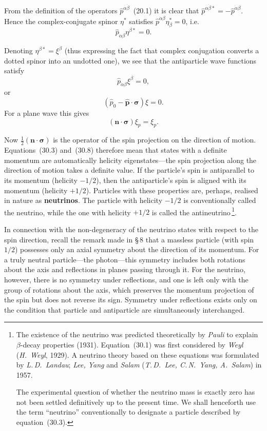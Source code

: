 From the definition of the operators $\widehat p^{\alpha\dot\beta}$~(20.1) it is clear that $\widehat p^{\alpha\dot\beta*} = -\widehat p^{\dot\alpha\beta}$. Hence the complex-conjugate spinor $\eta^*$ satisfies $\widehat p^{\dot\alpha\beta}\eta^*_\beta = 0$, i.e.\
\[
\widehat p_{\dot\alpha\beta}\eta^{\beta*} = 0.
\]

Denoting $\eta^{\beta*} = \xi^\beta$ (thus expressing the fact that complex conjugation converts a dotted spinor into an undotted one), we see that the antiparticle wave functions satisfy
\begin{equation}
\widehat p_{\dot\alpha\beta}\xi^\beta = 0,
\tag{30.6}
\end{equation}
or
\begin{equation}
(\widehat p_0 - \widehat{\mathbf{p}}\cdot\boldsymbol{\sigma})\xi = 0.
\tag{30.7}
\end{equation}
For a plane wave this gives
\begin{equation}
(\mathbf{n}\cdot\boldsymbol{\sigma})\xi_p = \xi_p.
\tag{30.8}
\end{equation}

Now $\frac{1}{2}(\mathbf{n}\cdot\boldsymbol{\sigma})$ is the operator of the spin projection on the direction of motion. Equations~(30.3) and~(30.8) therefore mean that states with a definite momentum are automatically helicity eigenstates---the spin projection along the direction of motion takes a definite value. If the particle's spin is antiparallel to its momentum (helicity $-1/2$), then the antiparticle's spin is aligned with its momentum (helicity $+1/2$). Particles with these properties are, perhaps, realised in nature as \textbf{neutrinos}. The particle with helicity $-1/2$ is conventionally called the neutrino, while the one with helicity $+1/2$ is called the antineutrino\,\footnote{The existence of the neutrino was predicted theoretically by \emph{Pauli} to explain $\beta$-decay properties (1931). Equation~(30.1) was first considered by \emph{Weyl} (\emph{H.~Weyl}, 1929). A neutrino theory based on these equations was formulated by \emph{L.\,D.~Landau}; \emph{Lee, Yang} and \emph{Salam} (\emph{T.\,D.~Lee, C.\,N.~Yang, A.~Salam}) in 1957.

The experimental question of whether the neutrino mass is exactly zero has not been settled definitively up to the present time. We shall henceforth use the term ``neutrino'' conventionally to designate a particle described by equation~(30.3).}.

In connection with the non-degeneracy of the neutrino states with respect to the spin direction, recall the remark made in \S\,8 that a massless particle (with spin $1/2$) possesses only an axial symmetry about the direction of its momentum. For a truly neutral particle---the photon---this symmetry includes both rotations about the axis and reflections in planes passing through it. For the neutrino, however, there is no symmetry under reflections, and one is left only with the group of rotations about the axis, which preserves the momentum projection of the spin but does not reverse its sign. Symmetry under reflections exists only on the condition that particle and antiparticle are simultaneously interchanged.

